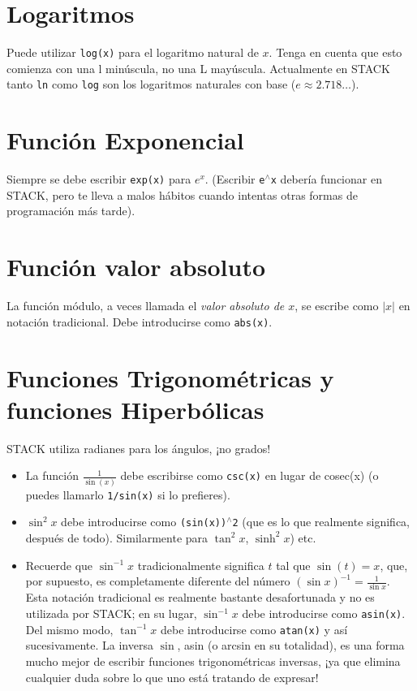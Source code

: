 \documentclass[a4paper]{article}
\newcommand{\stack}[1]{{\color{red}\tt #1}}
\begin{document}
\begin{multicols}{2}
\section*{Logaritmos}
Puede utilizar \stack{log(x)} para el logaritmo natural de $x$. Tenga en cuenta que esto comienza con una l minúscula, no una L mayúscula. Actualmente en STACK tanto \stack{ln} como \stack{log} son los logaritmos naturales con base ($e \approx 2.718 \dots$).

\section*{Función Exponencial}
Siempre se debe escribir \stack{exp(x)} para $e^x$. (Escribir \stack{e$^{\wedge}$x} debería funcionar en STACK, pero te lleva a malos hábitos cuando intentas otras formas de programación más tarde).

\section*{Función valor absoluto}
La función módulo, a veces llamada el {\em valor absoluto de $x$}, se escribe como $|x|$ en notación tradicional. Debe introducirse como \stack{abs(x)}.

\section*{Funciones Trigonométricas y funciones Hiperbólicas}
STACK utiliza radianes para los ángulos, ¡no grados!
\begin{itemize}
\item La función \(\frac{1}{\sin(x)}\) debe escribirse como \stack{csc(x)} en lugar de cosec(x) (o puedes llamarlo \stack{1/sin(x)} si lo prefieres).
\item $\sin^2{x}$ debe introducirse como \stack{(sin(x))$^{\wedge}$2} (que es lo que realmente significa, después de todo). Similarmente para $\tan^2{x}$, $\sinh^2{x}$) etc.
\item Recuerde que $\sin^{-1}{x}$ tradicionalmente significa $t$ tal que $\sin(t) = x$, que, por supuesto, es completamente diferente del número $(\sin{x})^{-1} = \frac{1}{\sin{x}}$. Esta notación tradicional es realmente bastante desafortunada y no es utilizada por STACK; en su lugar, $\sin^{-1}{x}$ debe introducirse como \stack{asin(x)}. Del mismo modo, $\tan^{-1}{x}$ debe introducirse como \stack{atan(x)} y así sucesivamente. La inversa $\sin$, asin (o arcsin en su totalidad), es una forma mucho mejor de escribir funciones trigonométricas inversas, ¡ya que elimina cualquier duda sobre lo que uno está tratando de expresar!
\end{itemize}


\end{multicols}
\end{document}
